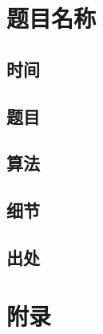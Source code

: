 \documentclass[a4paper]{article}
\begin{document}
		
	
	\newpage
	
	\section{题目名称}
		
	\subsection{时间}
		
		
		
	\subsection{题目}
		
		
		
	\subsection{算法}
		
		
		
	\subsection{细节}
		
		
		
	\subsection{出处}
		
		
	
	\newpage
	
	\section{附录}
		
\end{document}
